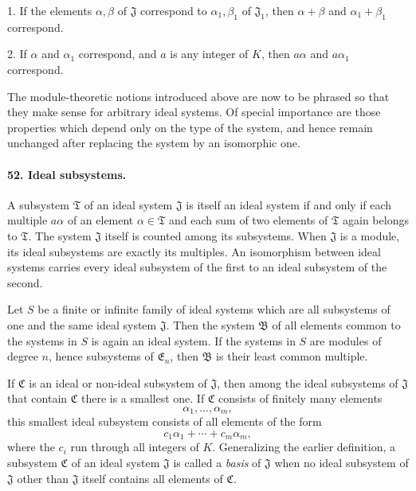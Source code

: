 \documentclass[11pt]{article}
\begin{document}
1. If the elements $\alpha,\beta$ of $\mathfrak J$ correspond to $\alpha_1,\beta_1$ of $\mathfrak J_1$, then $\alpha+\beta$ and $\alpha_1+\beta_1$ correspond.

2. If $\alpha$ and $\alpha_1$ correspond, and $a$ is any integer of $K$, then $a\alpha$ and $a\alpha_1$ correspond.

The module-theoretic notions introduced above are now to be phrased so that they make sense for arbitrary ideal systems. Of special importance are those properties which depend only on the type of the system, and hence remain unchanged after replacing the system by an isomorphic one.

\paragraph{52. Ideal subsystems.}
A subsystem $\mathfrak T$ of an ideal system $\mathfrak J$ is itself an ideal system if and only if each multiple $a\alpha$ of an element $\alpha\in\mathfrak T$ and each sum of two elements of $\mathfrak T$ again belongs to $\mathfrak T$. The system $\mathfrak J$ itself is counted among its subsystems. When $\mathfrak J$ is a module, its ideal subsystems are exactly its multiples. An isomorphism between ideal systems carries every ideal subsystem of the first to an ideal subsystem of the second.

Let $S$ be a finite or infinite family of ideal systems which are all subsystems of one and the same ideal system $\mathfrak J$. Then the system $\mathfrak B$ of all elements common to the systems in $S$ is again an ideal system. If the systems in $S$ are modules of degree $n$, hence subsystems of $\mathfrak E_n$, then $\mathfrak B$ is their least common multiple.

If $\mathfrak C$ is an ideal or non-ideal subsystem of $\mathfrak J$, then among the ideal subsystems of $\mathfrak J$ that contain $\mathfrak C$ there is a smallest one. If $\mathfrak C$ consists of finitely many elements
\[
  \alpha_1,\ldots,\alpha_m,
\]
this smallest ideal subsystem consists of all elements of the form
\begin{equation}
  c_1\alpha_1+\cdots+c_m\alpha_m,
\tag{87}
\end{equation}
where the $c_i$ run through all integers of $K$. Generalizing the earlier definition, a subsystem $\mathfrak C$ of an ideal system $\mathfrak J$ is called a \emph{basis} of $\mathfrak J$ when no ideal subsystem of $\mathfrak J$ other than $\mathfrak J$ itself contains all elements of $\mathfrak C$.
\end{document}
